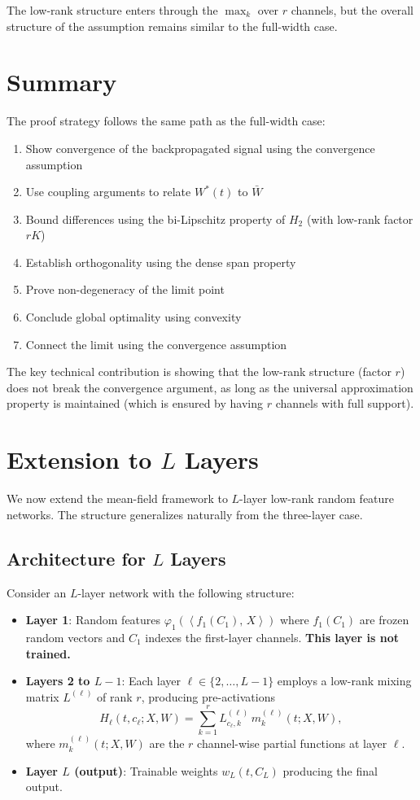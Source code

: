 \documentclass[11pt]{article}
\newcommand{\1}{\mathbbm{1}}
\newcommand{\ip}[2]{\left\langle #1,\,#2 \right\rangle}
\begin{document}
The low-rank structure enters through the $\max_k$ over $r$ channels, but the overall structure of the assumption remains similar to the full-width case.

\section{Summary}

The proof strategy follows the same path as the full-width case:
\begin{enumerate}
\item Show convergence of the backpropagated signal using the convergence assumption
\item Use coupling arguments to relate $W^*(t)$ to $\bar{W}$
\item Bound differences using the bi-Lipschitz property of $H_2$ (with low-rank factor $rK$)
\item Establish orthogonality using the dense span property
\item Prove non-degeneracy of the limit point
\item Conclude global optimality using convexity
\item Connect the limit using the convergence assumption
\end{enumerate}

The key technical contribution is showing that the low-rank structure (factor $r$) does not break the convergence argument, as long as the universal approximation property is maintained (which is ensured by having $r$ channels with full support).

\section{Extension to $L$ Layers}

We now extend the mean-field framework to $L$-layer low-rank random feature networks. The structure generalizes naturally from the three-layer case.

\subsection{Architecture for $L$ Layers}

Consider an $L$-layer network with the following structure:
\begin{itemize}
\item \textbf{Layer 1}: Random features $\varphi_1(\ip{f_1(C_1)}{X})$ where $f_1(C_1)$ are frozen random vectors and $C_1$ indexes the first-layer channels. \textbf{This layer is not trained.}
\item \textbf{Layers 2 to $L-1$}: Each layer $\ell\in\{2,\dots,L-1\}$ employs a low-rank mixing matrix $L^{(\ell)}$ of rank $r$, producing pre-activations
\[
H_\ell(t,c_\ell;X,W)=\sum_{k=1}^r L^{(\ell)}_{c_\ell,k}\,m_k^{(\ell)}(t;X,W),
\]
where $m_k^{(\ell)}(t;X,W)$ are the $r$ channel-wise partial functions at layer $\ell$.
\item \textbf{Layer $L$ (output)}: Trainable weights $w_L(t,C_L)$ producing the final output.
\end{itemize}
\end{document}

